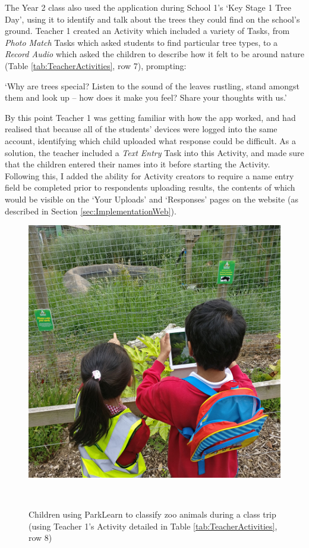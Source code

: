 The Year 2 class also used the application during School 1's `Key Stage 1 Tree Day', using it to identify and talk about the trees they could find on the school's ground. Teacher 1 created an Activity which included a variety of Tasks, from \textit{Photo Match} Tasks which asked students to find particular tree types, to a \textit{Record Audio} which asked the children to describe how it felt to be around nature (Table \ref{tab:TeacherActivities}, row 7), prompting:

\begin{displayquote}
`Why are trees special? Listen to the sound of the leaves rustling, stand amongst them and look up – how does it make you feel? Share your thoughts with us.' 
\end{displayquote}

By this point Teacher 1 was getting familiar with how the app worked, and had realised that because all of the students' devices were logged into the same account, identifying which child uploaded what response could be difficult. As a solution, the teacher included a \textit{Text Entry} Task into this Activity, and made sure that the children entered their names into it before starting the Activity. Following this, I added the ability for Activity creators to require a name entry field be completed prior to respondents uploading results, the contents of which would be visible on the `Your Uploads' and `Responses' pages on the website (as described in Section \ref{sec:ImplementationWeb}).

\begin{figure}
  \centering
  \includegraphics[width=0.6\columnwidth]{images/chapter07/zoo.jpg}
  \caption[Children using ParkLearn during a class trip to the zoo]{Children using ParkLearn to classify zoo animals during a class trip (using Teacher 1's Activity detailed in Table \ref{tab:TeacherActivities}, row 8)}~\label{fig:ParkLearnZoo}
\end{figure}

